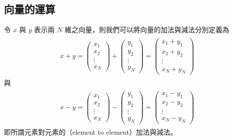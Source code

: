 \documentclass[letterpaper,10pt,english]{sphinxmanual}
\begin{document}
\subsection{向量的運算}
\label{\detokenize{notebook/mathematics-prerequisite:id4}}
令 \(x\) 與 \(y\) 表示兩 \(N\) 維之向量，則我們可以將向量的加法與減法分別定義為
\begin{equation*}
\begin{split}
\begin{aligned}
x  + y=
\begin{pmatrix}
x_1 \\
x_2 \\
\vdots \\
x_N
\end{pmatrix}
+
\begin{pmatrix}
y_1 \\
y_2 \\
\vdots \\
y_N
\end{pmatrix}
=
\begin{pmatrix}
x_1 + y_1 \\
x_2 + y_2 \\
\vdots \\
x_N + y_N
\end{pmatrix}
\end{aligned}
\end{split}
\end{equation*}
與
\begin{equation*}
\begin{split}
\begin{aligned}
x  - y=
\begin{pmatrix}
x_1 \\
x_2 \\
\vdots \\
x_N
\end{pmatrix}
-
\begin{pmatrix}
y_1 \\
y_2 \\
\vdots \\
y_N
\end{pmatrix}
=
\begin{pmatrix}
x_1 - y_1 \\
x_2 - y_2 \\
\vdots \\
x_N - y_N
\end{pmatrix}
\end{aligned}
\end{split}
\end{equation*}
即所謂元素對元素的（element to element）加法與減法。
\end{document}
